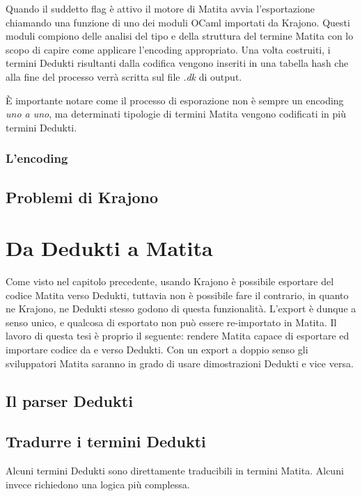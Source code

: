 \documentclass[12pt,a4paper]{report}
\begin{document}
Quando il suddetto flag è attivo il motore di Matita avvia l'esportazione chiamando
una funzione di uno dei moduli OCaml importati da Krajono. Questi moduli compiono
delle analisi del tipo e della struttura del termine Matita con lo scopo di
capire come applicare l'encoding appropriato. Una volta costruiti, i termini
Dedukti risultanti dalla codifica vengono inseriti in una tabella hash
che alla fine del processo verrà scritta sul file \textit{.dk} di output.

È importante notare come il processo di esporazione non è sempre un encoding
\textit{uno a uno}, ma determinati tipologie di termini Matita vengono codificati
in più termini Dedukti.

\subsection{L'encoding}

\section{Problemi di Krajono} \label{ProblemiKrajono}



\chapter{Da Dedukti a Matita}
Come visto nel capitolo precedente, usando Krajono è possibile esportare 
del codice Matita verso Dedukti, tuttavia non è possibile fare il contrario,
in quanto ne Krajono, ne Dedukti stesso godono di questa funzionalità.
L'export è dunque a senso unico, e qualcosa di esportato non può essere
re-importato in Matita. Il lavoro di questa tesi è proprio il seguente:
rendere Matita capace di esportare ed importare codice da e verso Dedukti.
Con un export a doppio senso gli sviluppatori Matita saranno in grado 
di usare dimostrazioni Dedukti e vice versa.

\section{Il parser Dedukti} \label{parserDedukti}

\section{Tradurre i termini Dedukti}
Alcuni termini Dedukti sono direttamente traducibili in termini Matita. Alcuni
invece richiedono una logica più complessa.
\end{document}
